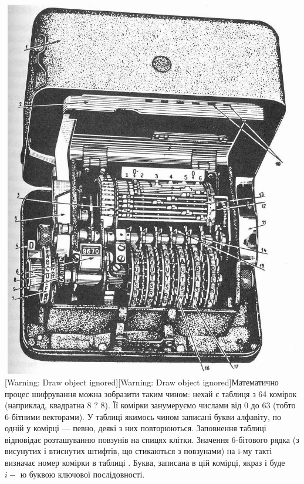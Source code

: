  \includegraphics[width=5.6252in,height=6.5555in]{crypt-img/crypt-img77.jpg}
[Warning: Draw object ignored][Warning: Draw object ignored]Математично процес
шифрування можна зобразити таким чином: нехай є таблиця з 64 комірок
(наприклад, квадратна 8 $?$ 8). Її комірки занумеруємо числами від 0 до 63
(тобто 6-бітними векторами). У таблиці якимось чином записані букви алфавіту,
по одній у комірці --- певно, деякі з них повторюються.  Заповнення таблиці
відповідає розташуванню повзунів на спицях клітки. Значення 6-бітового рядка 
(з висунутих і втиснутих штифтів, що стикаються з повзунами) на i-му такті
визначає номер комірки в таблиці . Буква, записана в цій комірці, якраз і буде 
$i-$ ю буквою ключової послідовності. 

